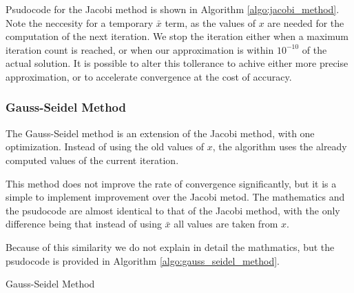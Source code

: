 \documentclass[../fem.tex]{subfiles}
\begin{document}
Psudocode for the Jacobi method is shown in Algorithm \ref{algo:jacobi_method}.
Note the neccesity for a temporary $\bar{x}$ term, as the values of $x$ are
needed for the computation of the next iteration. We stop the iteration either
when a maximum iteration count is reached, or when our approximation is within
$10^{-10}$ of the actual solution. It is possible to alter this tollerance to
achive either more precise approximation, or to accelerate convergence at the
cost of accuracy.


\subsubsection{Gauss-Seidel Method}%
\label{ssub:gauss_seidel_method}

The Gauss-Seidel method is an extension of the Jacobi method, with one
optimization. Instead of using the old values of $x$, the algorithm uses the
already computed values of the current iteration.

\begin{Figure}
   \begin{center}
     
   \end{center}
   \label{fig:gs_time}
\end{Figure}

This method does not improve the rate of convergence significantly, but it is a
simple to implement improvement over the Jacobi metod. The mathematics and the
psudocode are almost identical to that of the Jacobi method, with the only
difference being that instead of using $\bar{x}$ all values are taken from $x$.

\begin{Figure}
   \begin{center}
     
   \end{center}
   \label{fig:gs_err}
\end{Figure}

Because of this similarity we do not explain in detail the mathmatics, but the
psudocode is provided in Algorithm \ref{algo:gauss_seidel_method}.

\begin{algorithm}[H]
  \caption{Gauss-Seidel Method}\label{algo:gauss_seidel_method}
  \begin{algorithmic}
    \EndFor
    \EndFor
    \EndIf
    \EndFor
  \end{algorithmic}
\end{algorithm}
\end{document}
